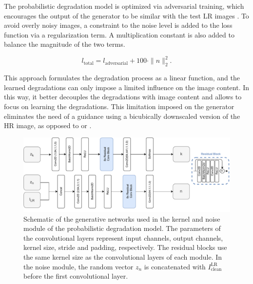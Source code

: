     The probabilistic degradation model is optimized via adversarial training, which encourages the output of the generator to be similar with the test LR images \cite{bulat2018learn}.
    To avoid overly noisy images, a constraint to the noise level is added to the loss function via a regularization term. 
    A multiplication constant is also added to balance the magnitude of the two terms.

    \begin{equation}
        l_{\text{total}} = l_{\text{adversarial}} + 100 \cdot \|n\|_2^2.
    \end{equation}

    This approach formulates the degradation process as a linear function, and the learned degradations can only impose a limited influence on the image content.
    In this way, it better decouples the degradations with image content and allows to focus on learning the degradations.
    This limitation imposed on the generator eliminates the need of a guidance using a bicubically downscaled version of the HR image, as opposed to \cite{wei2020unsupervised} or \cite{bulat2018learn}.

    \begin{figure}[H]
        \centering
        \includegraphics[width=\textwidth]{Includes/3-slim-gen-module.pdf}
        \caption{Schematic of the generative networks used in the kernel and noise module of the probabilistic degradation model.
        The parameters of the convolutional layers represent input channels, output channels, kernel size, stride and padding, respectively.
        The residual blocks use the same kernel size as the convolutional layers of each module. 
        In the noise module, the random vector $z_n$ is concatenated with $I_{\text{clean}}^{\text{LR}}$ before the first convolutional layer. }
        \label{fig:3-slim-gen-module}
    \end{figure}

